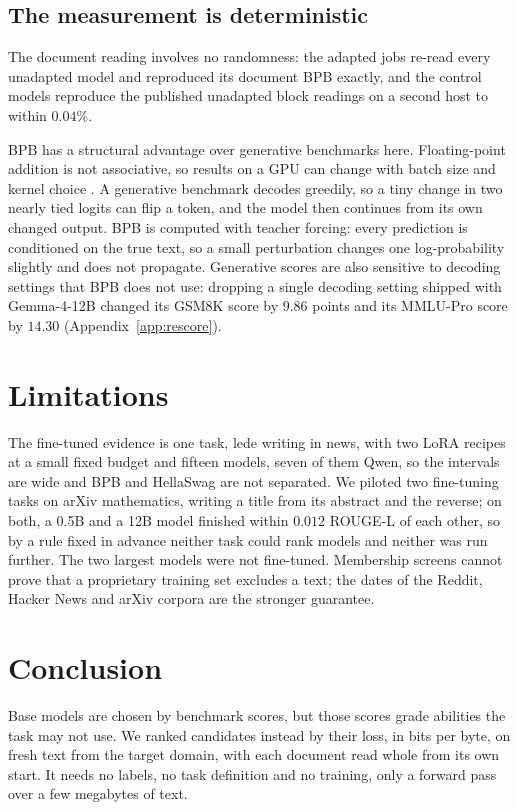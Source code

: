 \documentclass[10pt]{article}
\begin{document}
\subsection{The measurement is deterministic}
\label{sec:stability}
The document reading involves no randomness: the adapted jobs re-read every unadapted model and
reproduced its document BPB exactly, and the control models reproduce the published unadapted block
readings on a second host to within $0.04\%$.

BPB has a structural advantage over generative benchmarks here. Floating-point addition is not
associative, so results on a GPU can change with batch size and kernel choice
\citep{he2025nondeterminism}. A generative benchmark decodes greedily, so a tiny change in two
nearly tied logits can flip a token, and the model then continues from its own changed output.
BPB is computed with teacher forcing: every prediction is conditioned on the true text, so a small
perturbation changes one log-probability slightly and does not propagate. Generative scores are
also sensitive to decoding settings that BPB does not use: dropping a single decoding setting
shipped with Gemma-4-12B changed its GSM8K score by $9.86$ points and its MMLU-Pro score by $14.30$
(Appendix~\ref{app:rescore}).

\section{Limitations}
\label{sec:limits}
The fine-tuned evidence is one task, lede writing in news, with two LoRA recipes at a small fixed
budget and fifteen models, seven of them Qwen, so the intervals are wide and BPB and HellaSwag are
not separated. We piloted
two fine-tuning tasks on arXiv mathematics, writing a title from its abstract and the reverse; on
both, a 0.5B and a 12B model finished within $0.012$ ROUGE-L of each other, so by a rule fixed in
advance neither task could rank models and neither was run further. The two largest models were not
fine-tuned. Membership screens cannot prove that a proprietary training set excludes a text; the
dates of the Reddit, Hacker News and arXiv corpora are the stronger guarantee.

\section{Conclusion}
\label{sec:using}
Base models are chosen by benchmark scores, but those scores grade abilities the task may not use. We ranked candidates instead by their loss, in bits per byte, on fresh text from the
target domain, with each document read whole from its own start. It needs no labels, no task
definition and no training, only a forward pass over a few megabytes of text.
\end{document}
